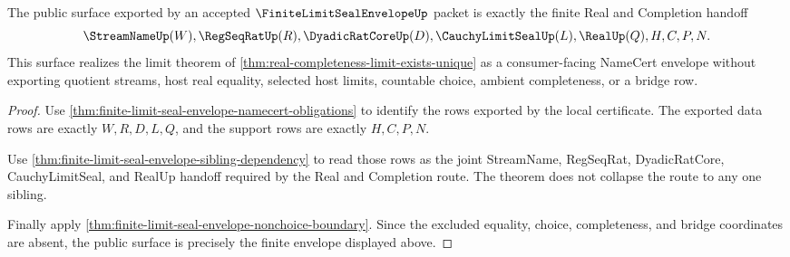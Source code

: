 \begin{theorem}
\label{thm:finite-limit-seal-envelope-public-surface}
The public surface exported by an accepted $\FiniteLimitSealEnvelopeUp$ packet is exactly the finite Real and Completion handoff
$$
\StreamNameUp(W),\RegSeqRatUp(R),\DyadicRatCoreUp(D),\CauchyLimitSealUp(L),\RealUp(Q),H,C,P,N.
$$
This surface realizes the limit theorem of \autoref{thm:real-completeness-limit-exists-unique} as a consumer-facing NameCert envelope without exporting quotient streams, host real equality, selected host limits, countable choice, ambient completeness, or a bridge row.
\end{theorem}
\begin{proof}
Use \autoref{thm:finite-limit-seal-envelope-namecert-obligations} to identify the rows exported by the local certificate. The exported data rows are exactly $W,R,D,L,Q$, and the support rows are exactly $H,C,P,N$.

Use \autoref{thm:finite-limit-seal-envelope-sibling-dependency} to read those rows as the joint StreamName, RegSeqRat, DyadicRatCore, CauchyLimitSeal, and RealUp handoff required by the Real and Completion route. The theorem does not collapse the route to any one sibling.

Finally apply \autoref{thm:finite-limit-seal-envelope-nonchoice-boundary}. Since the excluded equality, choice, completeness, and bridge coordinates are absent, the public surface is precisely the finite envelope displayed above.
\end{proof}


\begin{closurestatus}{\FiniteLimitSealEnvelopeUp}
  \theoryclosure{\seedClosure}
  \formalstatus{\unformalizedV}
\end{closurestatus}
